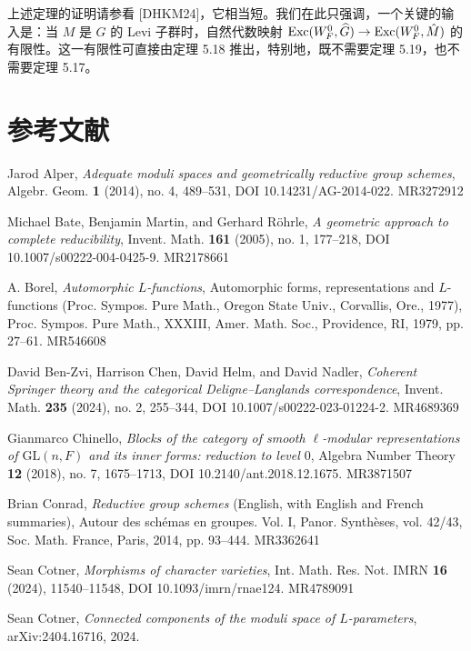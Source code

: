 上述定理的证明请参看 [DHKM24]，它相当短。我们在此只强调，一个关键的输入是：当 $M$ 是 $G$ 的 Levi 子群时，自然代数映射 $\mathrm{Exc}(W_F^0,\widehat{G})\to\mathrm{Exc}(W_F^0,\hat M)$ 的有限性。这一有限性可直接由定理 5.18 推出，特别地，既不需要定理 5.19，也不需要定理 5.17。

\section*{参考文献}
\begin{refs}
\item[{[Alp14]}] Jarod Alper, \emph{Adequate moduli spaces and geometrically reductive group schemes}, Algebr. Geom. \textbf{1} (2014), no. 4, 489--531, DOI 10.14231/AG-2014-022. MR3272912
\item[{[BMR05]}] Michael Bate, Benjamin Martin, and Gerhard R\"ohrle, \emph{A geometric approach to complete reducibility}, Invent. Math. \textbf{161} (2005), no. 1, 177--218, DOI 10.1007/s00222-004-0425-9. MR2178661
\item[{[Bor79]}] A. Borel, \emph{Automorphic $L$-functions}, Automorphic forms, representations and $L$-functions (Proc. Sympos. Pure Math., Oregon State Univ., Corvallis, Ore., 1977), Proc. Sympos. Pure Math., XXXIII, Amer. Math. Soc., Providence, RI, 1979, pp. 27--61. MR546608
\item[{[BZCHN20]}] David Ben-Zvi, Harrison Chen, David Helm, and David Nadler, \emph{Coherent Springer theory and the categorical Deligne--Langlands correspondence}, Invent. Math. \textbf{235} (2024), no. 2, 255--344, DOI 10.1007/s00222-023-01224-2. MR4689369
\item[{[Chi18]}] Gianmarco Chinello, \emph{Blocks of the category of smooth $\ell$-modular representations of $\mathrm{GL}(n,F)$ and its inner forms: reduction to level $0$}, Algebra Number Theory \textbf{12} (2018), no. 7, 1675--1713, DOI 10.2140/ant.2018.12.1675. MR3871507
\item[{[Con14]}] Brian Conrad, \emph{Reductive group schemes} (English, with English and French summaries), Autour des sch\'emas en groupes. Vol. I, Panor. Synth\`eses, vol. 42/43, Soc. Math. France, Paris, 2014, pp. 93--444. MR3362641
\item[{[Cot23]}] Sean Cotner, \emph{Morphisms of character varieties}, Int. Math. Res. Not. IMRN \textbf{16} (2024), 11540--11548, DOI 10.1093/imrn/rnae124. MR4789091
\item[{[Cot24]}] Sean Cotner, \emph{Connected components of the moduli space of $L$-parameters}, arXiv:2404.16716, 2024.

\end{refs}

